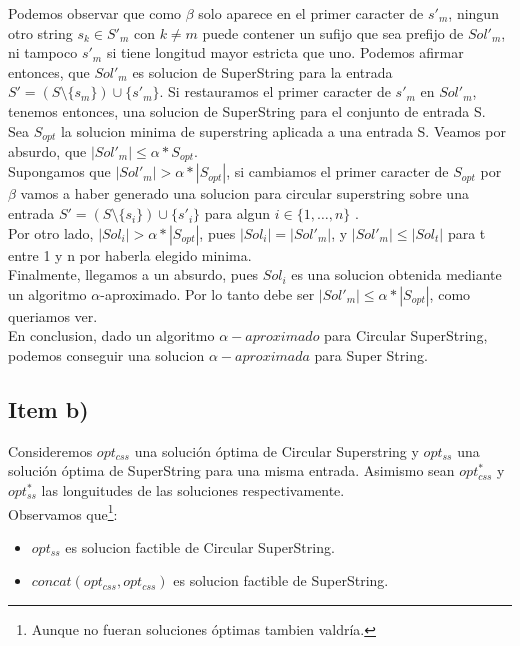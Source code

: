 \documentclass[10pt,a4paper]{article}
\begin{document}
Podemos observar que como $\beta$ solo aparece en el primer caracter de $s'_{m}$, ningun otro string $s_k \in S'_m$ con $k \neq m$ puede contener un sufijo que sea prefijo de $Sol'_m$, ni tampoco $s'_m$ si tiene longitud mayor estricta que uno. Podemos afirmar entonces, que $Sol'_m$ es solucion de SuperString para la entrada $S' = (S \setminus \{s_m\}) \cup   \{ s'_m \}$. Si restauramos el primer caracter de $s'_m$ en $Sol'_{m}$, tenemos entonces, una solucion de SuperString para el conjunto de entrada S.\\

Sea $S_{opt}$ la solucion minima de superstring aplicada a una entrada S. Veamos por absurdo, que $|Sol'_m| \leq \alpha * S_{opt}$.\\

Supongamos que $|Sol'_m| > \alpha * |S_{opt}|$, si cambiamos el primer caracter de $S_{opt}$ por $\beta$ vamos a haber generado una solucion para circular superstring sobre una entrada $S' = (S \setminus \{s_i\}) \cup \{ s'_i \}$ para algun $i \in \{1, \dots, n\}$ .\\

Por otro lado, $|Sol_i| > \alpha * |S_{opt}| $, pues $|Sol_i| = |Sol'_m|$, y $|Sol'_m| \leq |Sol_t|$ para t entre 1 y n por haberla elegido minima.\\

Finalmente, llegamos a un absurdo, pues $Sol_i$ es una solucion obtenida mediante un algoritmo $\alpha$-aproximado. Por lo tanto debe ser $|Sol'_m| \leq \alpha * |S_{opt}|$, como queriamos ver.\\

En conclusion, dado un algoritmo $\alpha-aproximado$ para Circular SuperString, podemos conseguir una solucion $\alpha-aproximada$ para Super String.

\subsection{Item b)}
Consideremos $opt_{css}$ una solución óptima de Circular Superstring y $opt_{ss}$ una solución óptima de SuperString para una misma entrada. Asimismo sean $opt_{css}^*$ y $opt_{ss}^*$ las longuitudes de las soluciones respectivamente.\\

Observamos que\footnote{Aunque no fueran soluciones óptimas tambien valdría.}:
\begin{itemize}
    \item $opt_{ss}$ es solucion factible de Circular SuperString.
    \item $concat(opt_{css}, opt_{css})$ es solucion factible de SuperString.
\end{itemize}
\end{document}
